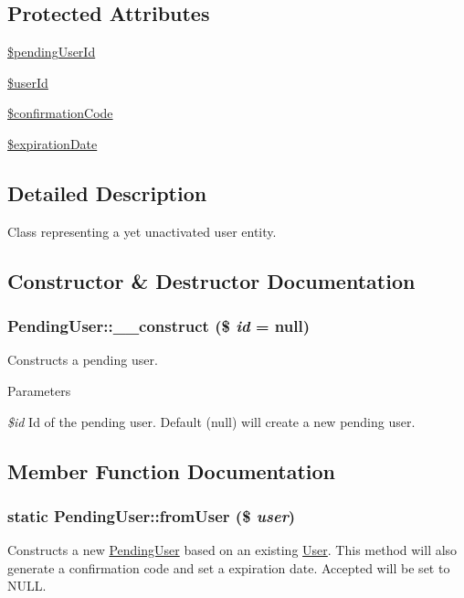\subsection*{Protected Attributes}
\begin{DoxyCompactItemize}
\item 
\hyperlink{classPendingUser_a3555aa718d233a642bf6d72cf4f2b3b6}{\$pendingUserId}
\item 
\hyperlink{classPendingUser_a059b78d9120ca9e3c497bc6860f39b03}{\$userId}
\item 
\hyperlink{classPendingUser_af0819189ce856cdde304084503839520}{\$confirmationCode}
\item 
\hyperlink{classPendingUser_a0319c006a79b51b47ef224fba80bf7c7}{\$expirationDate}
\end{DoxyCompactItemize}


\subsection{Detailed Description}
Class representing a yet unactivated user entity. 

\subsection{Constructor \& Destructor Documentation}
\hypertarget{classPendingUser_a8ca6afa50977bffebf9bd12a8f28fc64}{
\subsubsection[{\_\-\_\-construct}]{\setlength{\rightskip}{0pt plus 5cm}PendingUser::\_\-\_\-construct (\$ {\em id} = {\ttfamily null})}}
\label{classPendingUser_a8ca6afa50977bffebf9bd12a8f28fc64}
Constructs a pending user.


\begin{DoxyParams}{Parameters}
\item[{\em \$id}]Id of the pending user. Default (null) will create a new pending user. \end{DoxyParams}


\subsection{Member Function Documentation}
\hypertarget{classPendingUser_af4505a2c00bcb3df5369ac041cfff375}{
\subsubsection[{fromUser}]{\setlength{\rightskip}{0pt plus 5cm}static PendingUser::fromUser (\$ {\em user})}}
\label{classPendingUser_af4505a2c00bcb3df5369ac041cfff375}
Constructs a new \hyperlink{classPendingUser}{PendingUser} based on an existing \hyperlink{classUser}{User}. This method will also generate a confirmation code and set a expiration date. Accepted will be set to NULL.

